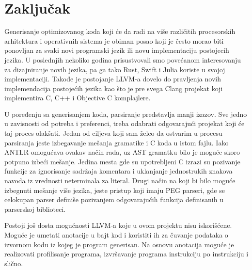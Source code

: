 \chapter{Zaključak}
\label{ch:zakljucak}

Generisanje optimizovanog koda koji će da radi na više različitih procesorskih arhitektura i operativnih sistema je obiman posao koji je često morao biti ponovljan za svaki novi programski jezik ili novu implementaciju postojecih jezika.
U poslednjih nekoliko godina prisustvovali smo povećanom interesovanju za dizajniranje novih jezika, pa ga tako Rust, Swift i Julia koriste u svojoj implementaciji.
Takođe je postojanje LLVM-a dovelo do pravljenja novih implemendacija postojećih jezika kao što je pre svega Clang projekat koji implementira C, C++ i Objective C komplajlere.

U poređenju sa generisanjem koda, parsiranje predstavlja manji izazov.
Sve jedno u zavisnosti od potreba i preferenci, treba odabrati odgovarajući projekat koji će taj proces olakšati.
Jedan od ciljeva koji sam želeo da ostvarim u procesu parsiranja jeste izbegavanje mešanja gramatike i C koda u istom fajlu.
Iako ANTLR omogućava ovakav način rada, uz AST gramatku bilo je moguće skoro potpuno izbeći mešanje.
Jedina mesta gde su upotrebljeni C izrazi su pozivanje  funkcije za ignorisanje sadržaja komentara i uklanjanje jednostrukih znakova navoda iz vrednosti neterminala za  literal.
Drugi način na koji bi bilo moguće izbegnuti mešanje više jezika, jeste pristup koji imaju PEG parseri, gde se celokupan parser definiše pozivanjem odgovarajućih funkcija definisanih u parserskoj biblioteci.

Postoji još dosta mogućnosti LLVM-a koje u ovom projektu nisu iskorišćene.
Moguće je umetati anotacije u bajt kod i koristiti ih za čuvanje podataka o izvornom kodu iz kojeg je program generisan.
Na osnovu anotacija moguće je realizovati profilisanje programa, izvršavanje programa instrukciju po instrukciju i slično.

